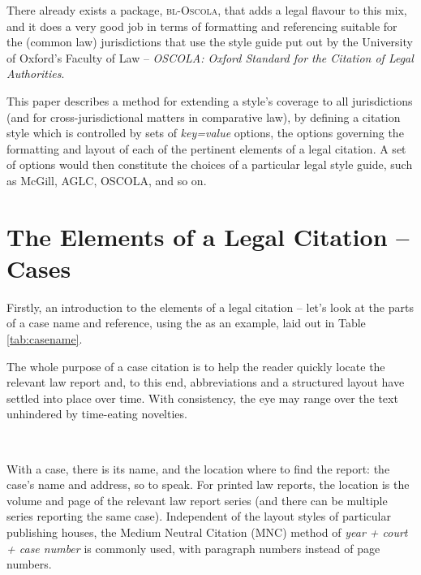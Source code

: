 There already exists a package, \textsc{bl-Oscola}, that adds a legal flavour to this mix, and it does a very good job in terms of formatting and referencing suitable for the (common law) jurisdictions that use the style guide put out by the University of Oxford's Faculty of Law -- \textit{OSCOLA: Oxford Standard for the Citation of Legal Authorities}.

This paper describes a method for extending a style's coverage to all jurisdictions (and for cross-jurisdictional matters in comparative law), by defining a citation style which is controlled by sets of \textit{key=value} options, the options governing the formatting and layout of each of the pertinent elements of a legal citation. A set of options would then constitute the choices of a particular legal style guide, such as McGill, AGLC, OSCOLA, and so on. 

\section{The Elements of a Legal Citation -- Cases}
Firstly, an introduction to the elements of a legal citation -- let's look at the parts of a case name and reference, using the 
as an example, laid out in Table \ref{tab:casename}.

The whole purpose of a case citation is to help the reader quickly locate the relevant law report and, to this end, abbreviations and a structured layout have settled into place over time. With consistency, the eye may range over the text unhindered by time-eating novelties.
\bigskip

\hfill{}\hfill\ 
\bigskip


With a case, there is its name, and the location where to find the report: the case's name and address, so to speak. For printed law reports, the location is the volume and page of the relevant law report series (and there can be multiple series reporting the same case). Independent of the layout styles of particular publishing houses, the Medium Neutral Citation (MNC) method of \textit{year + court + case number} is commonly used, with paragraph numbers instead of page numbers.

